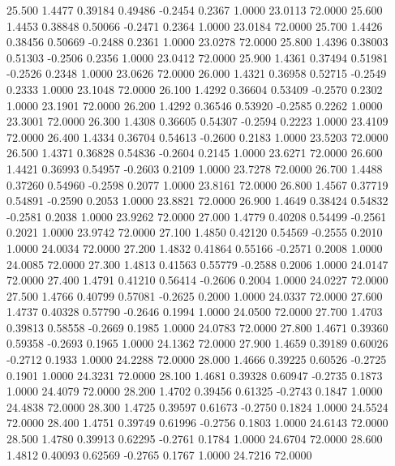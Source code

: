   25.500   1.4477   0.39184   0.49486  -0.2454   0.2367   1.0000  23.0113  72.0000
  25.600   1.4453   0.38848   0.50066  -0.2471   0.2364   1.0000  23.0184  72.0000
  25.700   1.4426   0.38456   0.50669  -0.2488   0.2361   1.0000  23.0278  72.0000
  25.800   1.4396   0.38003   0.51303  -0.2506   0.2356   1.0000  23.0412  72.0000
  25.900   1.4361   0.37494   0.51981  -0.2526   0.2348   1.0000  23.0626  72.0000
  26.000   1.4321   0.36958   0.52715  -0.2549   0.2333   1.0000  23.1048  72.0000
  26.100   1.4292   0.36604   0.53409  -0.2570   0.2302   1.0000  23.1901  72.0000
  26.200   1.4292   0.36546   0.53920  -0.2585   0.2262   1.0000  23.3001  72.0000
  26.300   1.4308   0.36605   0.54307  -0.2594   0.2223   1.0000  23.4109  72.0000
  26.400   1.4334   0.36704   0.54613  -0.2600   0.2183   1.0000  23.5203  72.0000
  26.500   1.4371   0.36828   0.54836  -0.2604   0.2145   1.0000  23.6271  72.0000
  26.600   1.4421   0.36993   0.54957  -0.2603   0.2109   1.0000  23.7278  72.0000
  26.700   1.4488   0.37260   0.54960  -0.2598   0.2077   1.0000  23.8161  72.0000
  26.800   1.4567   0.37719   0.54891  -0.2590   0.2053   1.0000  23.8821  72.0000
  26.900   1.4649   0.38424   0.54832  -0.2581   0.2038   1.0000  23.9262  72.0000
  27.000   1.4779   0.40208   0.54499  -0.2561   0.2021   1.0000  23.9742  72.0000
  27.100   1.4850   0.42120   0.54569  -0.2555   0.2010   1.0000  24.0034  72.0000
  27.200   1.4832   0.41864   0.55166  -0.2571   0.2008   1.0000  24.0085  72.0000
  27.300   1.4813   0.41563   0.55779  -0.2588   0.2006   1.0000  24.0147  72.0000
  27.400   1.4791   0.41210   0.56414  -0.2606   0.2004   1.0000  24.0227  72.0000
  27.500   1.4766   0.40799   0.57081  -0.2625   0.2000   1.0000  24.0337  72.0000
  27.600   1.4737   0.40328   0.57790  -0.2646   0.1994   1.0000  24.0500  72.0000
  27.700   1.4703   0.39813   0.58558  -0.2669   0.1985   1.0000  24.0783  72.0000
  27.800   1.4671   0.39360   0.59358  -0.2693   0.1965   1.0000  24.1362  72.0000
  27.900   1.4659   0.39189   0.60026  -0.2712   0.1933   1.0000  24.2288  72.0000
  28.000   1.4666   0.39225   0.60526  -0.2725   0.1901   1.0000  24.3231  72.0000
  28.100   1.4681   0.39328   0.60947  -0.2735   0.1873   1.0000  24.4079  72.0000
  28.200   1.4702   0.39456   0.61325  -0.2743   0.1847   1.0000  24.4838  72.0000
  28.300   1.4725   0.39597   0.61673  -0.2750   0.1824   1.0000  24.5524  72.0000
  28.400   1.4751   0.39749   0.61996  -0.2756   0.1803   1.0000  24.6143  72.0000
  28.500   1.4780   0.39913   0.62295  -0.2761   0.1784   1.0000  24.6704  72.0000
  28.600   1.4812   0.40093   0.62569  -0.2765   0.1767   1.0000  24.7216  72.0000
